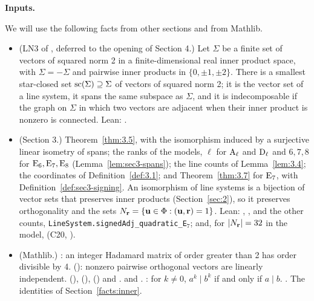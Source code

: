 \medskip\noindent\textbf{Inputs.}\label{input:sec6}
\begingroup\raggedright
We will use the following facts from other sections and from Mathlib.
\begin{itemize}
 \item {}(LN3 of , deferred to the opening of
  Section 4.) Let $\Sigma$ be a finite set of vectors of squared norm 2 in a finite-dimensional
  real inner product space, with $\Sigma=-\Sigma$ and pairwise inner products in
  $\{0,\pm1,\pm2\}$. There is a smallest star-closed set $\mathop{\mathrm{sc}}\nolimits(\Sigma)\supseteq\Sigma$ of vectors
  of squared norm 2; it is the vector set of a line system, it spans the same subspace as
  $\Sigma$, and it is indecomposable if the graph on $\Sigma$ in which two vectors are adjacent
  when their inner product is nonzero is connected. Lean: .
 \item {}(Section 3.) Theorem~\ref{thm:3.5}, with the isomorphism
  induced by a surjective linear isometry of spans; the ranks of the models, $\ell$ for
  $\mathrm{A}_\ell$ and $\mathrm{D}_\ell$ and $6,7,8$ for $\mathrm{E}_6,\mathrm{E}_7,\mathrm{E}_8$
  (Lemma~\ref{lem:sec3-spans}); the line counts of Lemma~\ref{lem:3.4}; the coordinates of
  Definition~\ref{def:3.1}; and Theorem~\ref{thm:3.7} for $\mathrm{E}_7$, with
  Definition~\ref{def:sec3-signing}. An isomorphism of line systems is a bijection of vector sets
  that preserves inner products (Section~\ref{sec:2}), so it preserves orthogonality and the sets
  $N_{\mathbf r}=\{{\mathbf u}\in\Phi:({\mathbf u},{\mathbf r})=1\}$. Lean: ,
  ,
  and the other counts,
   {\texttt{LineSystem.signedAdj\_quadratic\_E\ensuremath{{}_7}}};
  and, for $|N_{\mathbf r}|=32$ in the model,
  (C20, ).
 \item {}(Mathlib.) : an
  integer Hadamard matrix of order greater than 2 has order divisible by 4.
  (): nonzero pairwise orthogonal vectors
  are linearly independent. 
  (),
  (), 
  () and
  .  and .
  : for $k\neq0$, $a^k\mid b^k$ if and only if $a\mid b$.
  . The identities of Section~\ref{facts:inner}.
\end{itemize}
\endgroup

